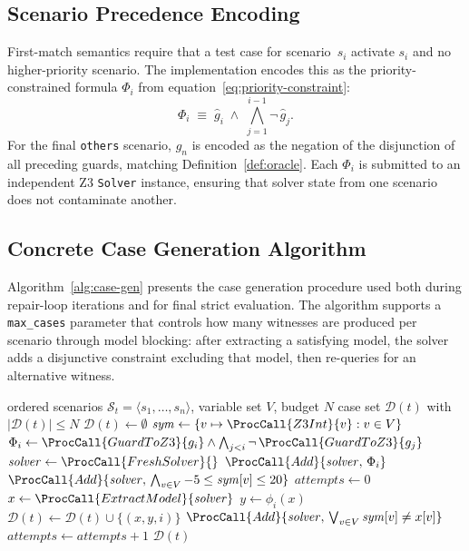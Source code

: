 \subsection{Scenario Precedence Encoding}

First-match semantics require that a test case for scenario~$s_i$ activate
$s_i$ and no higher-priority scenario.  The implementation encodes this as
the priority-constrained formula $\Phi_i$ from
equation~\eqref{eq:priority-constraint}:
\[
  \Phi_i \;\equiv\; \widehat{g}_i \;\land\;
    \bigwedge_{j=1}^{i-1} \lnot\,\widehat{g}_j.
\]
For the final \texttt{others} scenario, $\widehat{g}_n$ is encoded as the
negation of the disjunction of all preceding guards, matching
Definition~\ref{def:oracle}.  Each $\Phi_i$ is submitted to an independent
Z3 \texttt{Solver} instance, ensuring that solver state from one scenario
does not contaminate another.

\subsection{Concrete Case Generation Algorithm}

Algorithm~\ref{alg:case-gen} presents the case generation procedure used
both during repair-loop iterations and for final strict evaluation.  The
algorithm supports a \texttt{max\_cases} parameter that controls how many
witnesses are produced per scenario through model blocking: after extracting
a satisfying model, the solver adds a disjunctive constraint excluding that
model, then re-queries for an alternative witness.

\begin{algorithm}[t]
\caption{Z3-Based Concrete Case Generation}
\label{alg:case-gen}
\begin{algorithmic}[1]
\Require ordered scenarios $\mathcal{S}_t = \langle s_1,\ldots,s_n\rangle$,
         variable set $V$, budget $N$
\Ensure case set $\mathcal{D}(t)$ with $|\mathcal{D}(t)| \le N$
\State $\mathcal{D}(t) \leftarrow \emptyset$
\State $\mathit{sym} \leftarrow \{v \mapsto \ProcCall{Z3Int}{v} : v \in V\}$
  \State $\Phi_i \leftarrow \ProcCall{GuardToZ3}{g_i} \land
         \bigwedge_{j<i} \lnot\,\ProcCall{GuardToZ3}{g_j}$
  \State $\mathit{solver} \leftarrow \ProcCall{FreshSolver}{}$
  \State $\ProcCall{Add}{\mathit{solver},\,\Phi_i}$
  \State $\ProcCall{Add}{\mathit{solver},\,
         \bigwedge_{v \in V} -5 \le \mathit{sym}[v] \le 20}$
  \State $\mathit{attempts} \leftarrow 0$
    \State $x \leftarrow \ProcCall{ExtractModel}{\mathit{solver}}$
    \State $y \leftarrow \phi_i(x)$ 
    \State $\mathcal{D}(t) \leftarrow \mathcal{D}(t) \cup \{(x, y, i)\}$
    \State $\ProcCall{Add}{\mathit{solver},\,
           \bigvee_{v \in V} \mathit{sym}[v] \ne x[v]}$
    \State $\mathit{attempts} \leftarrow \mathit{attempts} + 1$
  \EndWhile
\EndFor
\State \Return $\mathcal{D}(t)$
\end{algorithmic}
\end{algorithm}

